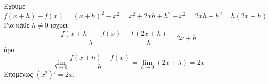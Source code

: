 Έχουμε
\[ f(x+h)-f(x)=(x+h)^2-x^2=x^2+2xh+h^2-x^2=2xh+h^2=h(2x+h) \]
Για κάθε $ h\neq 0 $ ισχύει
\[ \frac{f(x+h)-f(x)}{h}=\frac{h(2x+h)}{h}=2x+h \]
άρα
\[ \lim_{h\to 0}\frac{f(x+h)-f(x)}{h}=\lim_{h\to 0}(2x+h)=2x \]
Επομένως $ (x^2)'=2x $.
